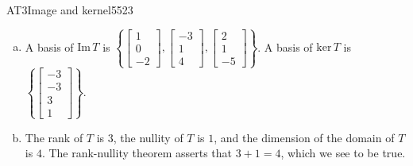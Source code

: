 \begin{exercise}{AT3}{Image and kernel}{5523}
\begin{exerciseAnswer}
\begin{enumerate}[(a)]
 
\item  

 A basis of \(\mathrm{Im}\,T\) is \(\left\{ \left[\begin{array}{c}
1 \\
0 \\
-2
\end{array}\right] , \left[\begin{array}{c}
-3 \\
1 \\
4
\end{array}\right] , \left[\begin{array}{c}
2 \\
1 \\
-5
\end{array}\right] \right\}\). A basis of \(\mathrm{ker}\,T\) is \(\left\{ \left[\begin{array}{c}
-3 \\
-3 \\
3 \\
1
\end{array}\right] \right\}\). 

 
\item  

 The rank of \(T\) is \(3\), the nullity of \(T\) is \(1\), and the dimension of the domain of \(T\) is \(4\). The rank-nullity theorem asserts that \(3+1=4\), which we see to be true. 

 
\end{enumerate}

     \end{exerciseAnswer}
 \end{exercise}


